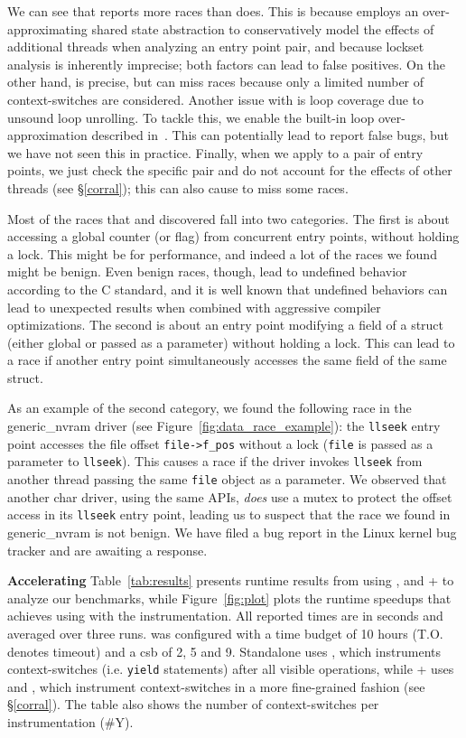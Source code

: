 We can see that \whoop reports more races than \corral does. This is because \whoop employs an over-approximating shared state abstraction to conservatively model the effects of additional threads when analyzing an entry point pair, and because lockset analysis is inherently imprecise; both factors can lead to false positives.  On the other hand, \corral is precise, but can miss races because only a limited number of context-switches are considered.  Another issue with \corral is loop coverage due to unsound loop unrolling. To tackle this, we enable the built-in loop over-approximation described in~\cite{lal2014powering}. This can potentially lead \corral to report false bugs, but we have not seen this in practice. Finally, when we apply \corral to a pair of entry points, we just check the specific pair and do not account for the effects of other threads (see \S\ref{corral}); this can also cause \corral to miss some races.

Most of the races that \whoop and \corral discovered fall into two categories. The first is about accessing a global counter (or flag) from concurrent entry points, without holding a lock. This might be for performance, and indeed a lot of the races we found might be benign. Even benign races, though, lead to undefined behavior according to the C standard, and it is well known that undefined behaviors can lead to unexpected results when combined with aggressive compiler optimizations. The second is about an entry point modifying a field of a struct (either global or passed as a parameter) without holding a lock. This can lead to a race if another entry point simultaneously accesses the same field of the same struct.

As an example of the second category, we found the following race in the generic\_nvram driver (see Figure~\ref{fig:data_race_example}): the \texttt{llseek} entry point accesses the file offset \texttt{file->f\_pos} without a lock (\texttt{file} is passed as a parameter to \texttt{llseek}). This causes a race if the driver invokes \texttt{llseek} from another thread passing the same \texttt{file} object as a parameter.  We observed that another char driver, using the same APIs, \emph{does} use a mutex to protect the offset access in its \texttt{llseek} entry point, leading us to suspect that the race we found in generic\_nvram is not benign.  We have filed a bug report in the Linux kernel bug tracker and are awaiting a response.

\noindent\textbf{Accelerating \corral }
%
Table~\ref{tab:results} presents runtime results from using \whoop, \corral and \whoop + \corral to analyze our benchmarks, while Figure~\ref{fig:plot} plots the runtime speedups that \corral achieves using \whoop with the \yieldmr instrumentation. All reported times are in seconds and averaged over three runs. \corral was configured with a time budget of 10 hours (T.O. denotes timeout) and a csb of 2, 5 and 9. Standalone \corral uses \yieldall, which instruments context-switches (i.e. \texttt{yield} statements) after all visible operations, while \whoop + \corral uses \yieldcoarse and \yieldmr, which instrument context-switches in a more fine-grained fashion (see \S\ref{corral}). The table also shows the number of context-switches per instrumentation (\#Y).

